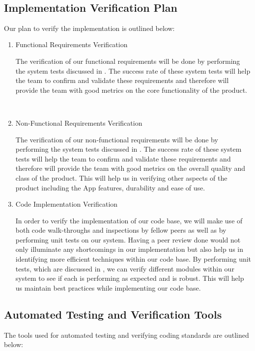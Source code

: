 \documentclass[12pt, titlepage]{article}
\begin{document}
\-\

\subsection{Implementation Verification Plan}

Our plan to verify the implementation is outlined below:
\begin{enumerate}
\item Functional Requirements Verification

\subitem The verification of our functional requirements will be done by performing the system tests discussed in . The success rate of these system tests will help the team to confirm and validate these requirements and therefore will provide the team with good metrics on the core functionality of the product.

~\newpage

\item Non-Functional Requirements Verification

\subitem The verification of our non-functional requirements will be done by performing the system tests discussed in . The success rate of these system tests will help the team to confirm and validate these requirements and therefore will provide the team with good metrics on the overall quality and class of the product. This will help us in verifying other aspects of the product including the App features, durability and ease of use.

\item Code Implementation Verification

\subitem In order to verify the implementation of our code base, we will make use of both code walk-throughs and inspections by fellow peers as well as by performing unit tests on our system. Having a peer review done would not only illuminate any shortcomings in our implementation but also help us in identifying more efficient techniques within our code base. By performing unit tests, which are discussed in , we can verify different modules within our system to see if each is performing as expected and is robust. This will help us maintain best practices while implementing our code base.

\end{enumerate}

\subsection{Automated Testing and Verification Tools}
The tools used for automated testing and verifying coding standards are outlined below:
\end{document}
